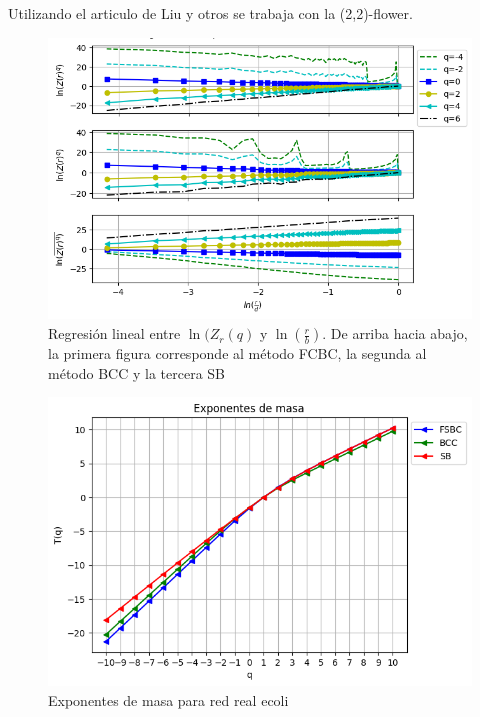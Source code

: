 Utilizando el articulo de Liu y otros\cite{Liu2015} se trabaja con la (2,2)-flower.

\begin{figure}[H]
    \centering
    \includegraphics[scale=0.7]{Capitulo4Multifractalidad/imagenes/a_TqLnrBCflower22.png}
    \caption{Regresión lineal entre $\ln(Z_r(q)$ y $\ln(\frac{r}{b})$. De arriba hacia abajo, la primera figura corresponde al método FCBC, la segunda al método BCC y la tercera SB}
\end{figure}

\begin{figure}[H]
    \centering
    \includegraphics[scale=0.7]{Capitulo4Multifractalidad/imagenes/a_Tqflower22.png}
    \caption{Exponentes de masa para red real ecoli}
\end{figure}

